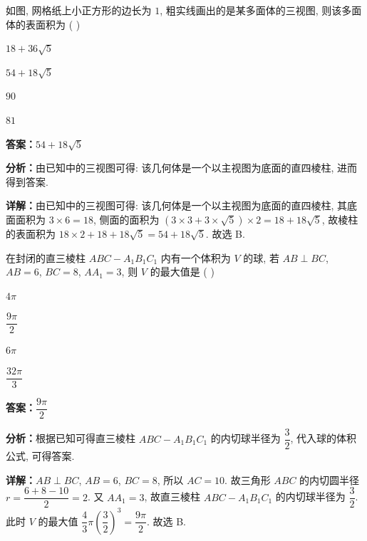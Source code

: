 \begin{question}[points=5]
如图, 网格纸上小正方形的边长为 $1$, 粗实线画出的是某多面体的三视图, 则该多面体的表面积为 ( )
\begin{choices}
  \item $18+36\sqrt{5}$
  \item $54+18\sqrt{5}$
  \item $90$
  \item $81$
\end{choices}
\begin{solution}
\textbf{答案：}$54+18\sqrt{5}$

\textbf{分析：}由已知中的三视图可得: 该几何体是一个以主视图为底面的直四棱柱, 进而得到答案.

\textbf{详解：}由已知中的三视图可得: 该几何体是一个以主视图为底面的直四棱柱, 其底面面积为 $3\times6=18$, 侧面的面积为 $(3\times3+3\times\sqrt{5})\times2=18+18\sqrt{5}$, 故棱柱的表面积为 $18\times2+18+18\sqrt{5}=54+18\sqrt{5}$. 故选 B.
\end{solution}
\end{question}

\begin{question}[points=5]
在封闭的直三棱柱 $ABC-A_1B_1C_1$ 内有一个体积为 $V$ 的球, 若 $AB\perp BC$, $AB=6$, $BC=8$, $AA_1=3$, 则 $V$ 的最大值是 ( )
\begin{choices}
  \item $4\pi$
  \item $\dfrac{9\pi}{2}$
  \item $6\pi$
  \item $\dfrac{32\pi}{3}$
\end{choices}
\begin{solution}
\textbf{答案：}$\dfrac{9\pi}{2}$

\textbf{分析：}根据已知可得直三棱柱 $ABC-A_1B_1C_1$ 的内切球半径为 $\dfrac{3}{2}$, 代入球的体积公式, 可得答案.

\textbf{详解：}$AB\perp BC$, $AB=6$, $BC=8$, 所以 $AC=10$. 故三角形 $ABC$ 的内切圆半径 $r=\dfrac{6+8-10}{2}=2$. 又 $AA_1=3$, 故直三棱柱 $ABC-A_1B_1C_1$ 的内切球半径为 $\dfrac{3}{2}$. 此时 $V$ 的最大值 $\dfrac{4}{3}\pi\left(\dfrac{3}{2}\right)^3=\dfrac{9\pi}{2}$. 故选 B.
\end{solution}
\end{question}


